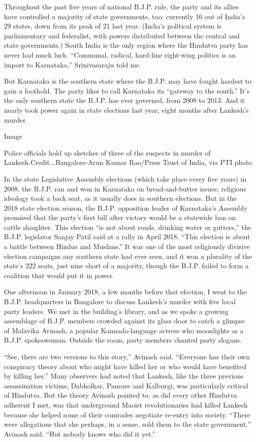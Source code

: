 Throughout the past five years of national B.J.P. rule, the party and
its allies have controlled a majority of state governments, too:
currently 16 out of India's 29 states, down from its peak of 21 last
year. (India's political system is parliamentary and federalist, with
powers distributed between the central and state governments.) South
India is the only region where the Hindutva party has never had much
luck. ``Communal, radical, hard-line right-wing politics is an import to
Karnataka,'' Srinivasaraju told me.

But Karnataka is the southern state where the B.J.P. may have fought
hardest to gain a foothold. The party likes to call Karnataka its
``gateway to the south.'' It's the only southern state the B.J.P. has
ever governed, from 2008 to 2013. And it nearly took power again in
state elections last year, eight months after Lankesh's murder.

Image

Police officials hold up sketches of three of the suspects in murder of
Lankesh.Credit...Bangalore-Arun Kumar Rao/Press Trust of India, via PTI
photo

In the state Legislative Assembly elections (which take place every five
years) in 2008, the B.J.P. ran and won in Karnataka on bread-and-butter
issues; religious ideology took a back seat, as it usually does in
southern elections. But in the 2018 state election season, the B.J.P.
opposition leader of Karnataka's Assembly promised that the party's
first bill after victory would be a statewide ban on cattle slaughter.
This election ``is not about roads, drinking water or gutters,'' the
B.J.P. legislator Sanjay Patil said at a rally in April 2018. ``This
election is about a battle between Hindus and Muslims.'' It was one of
the most religiously divisive election campaigns any southern state had
ever seen, and it won a plurality of the state's 222 seats, just nine
short of a majority, though the B.J.P. failed to form a coalition that
would put it in power.

One afternoon in January 2018, a few months before that election, I went
to the B.J.P. headquarters in Bangalore to discuss Lankesh's murder with
five local party leaders. We met in the building's library, and as we
spoke a growing assemblage of B.J.P. members crowded against its glass
door to catch a glimpse of Malavika Avinash, a popular Kannada-language
actress who moonlights as a B.J.P. spokeswoman. Outside the room, party
members chanted party slogans.

``See, there are two versions to this story,'' Avinash said. ``Everyone
has their own conspiracy theory about who might have killed her or who
would have benefited by killing her.'' Many observers had noted that
Lankesh, like the three previous assassination victims, Dabholkar,
Pansare and Kalburgi, was particularly critical of Hindutva. But the
theory Avinash pointed to, as did every other Hindutva adherent I met,
was that underground Maoist revolutionaries had killed Lankesh because
she helped some of their comrades negotiate re-entry into society.
``There were allegations that she perhaps, in a sense, sold them to the
state government,'' Avinash said. ``But nobody knows who did it yet.''

